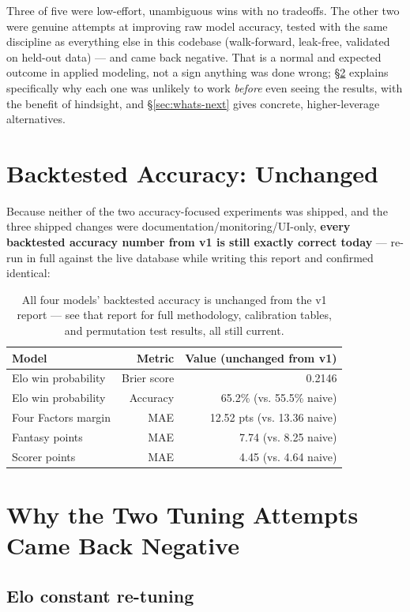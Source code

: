 \documentclass[11pt]{article}
\begin{document}
Three of five were low-effort, unambiguous wins with no tradeoffs. The other two were genuine attempts at
improving raw model accuracy, tested with the same discipline as everything else in this codebase (walk-forward,
leak-free, validated on held-out data) — and came back negative. That is a normal and expected outcome in
applied modeling, not a sign anything was done wrong; \S\ref{sec:why-negative} explains specifically why each
one was unlikely to work \emph{before} even seeing the results, with the benefit of hindsight, and
\S\ref{sec:whats-next} gives concrete, higher-leverage alternatives.

\section{Backtested Accuracy: Unchanged}

Because neither of the two accuracy-focused experiments was shipped, and the three shipped changes were
documentation/monitoring/UI-only, \textbf{every backtested accuracy number from v1 is still exactly correct
today} — re-run in full against the live database while writing this report and confirmed identical:

\begin{table}[h]
\centering
\small
\begin{tabular}{lrr}
\toprule
Model & Metric & Value (unchanged from v1) \\
\midrule
Elo win probability & Brier score & 0.2146 \\
Elo win probability & Accuracy & 65.2\% (vs. 55.5\% naive) \\
Four Factors margin & MAE & 12.52 pts (vs. 13.36 naive) \\
Fantasy points & MAE & 7.74 (vs. 8.25 naive) \\
Scorer points & MAE & 4.45 (vs. 4.64 naive) \\
\bottomrule
\end{tabular}
\caption{All four models' backtested accuracy is unchanged from the v1 report — see that report for full
methodology, calibration tables, and permutation test results, all still current.}
\end{table}

\section{Why the Two Tuning Attempts Came Back Negative}
\label{sec:why-negative}

\subsection{Elo constant re-tuning}
\label{sec:elo-tuning}
\end{document}
